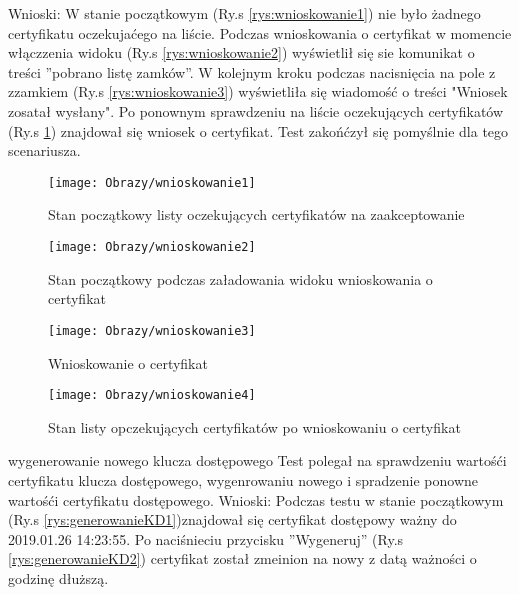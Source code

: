 \begin{enumerate*}
	Wnioski: W stanie początkowym (Ry.s \ref{rys:wnioskowanie1}) nie było żadnego certyfikatu oczekujaćego na liście. Podczas wnioskowania o certyfikat w momencie włączzenia widoku (Ry.s \ref{rys:wnioskowanie2}) wyświetlił się  sie komunikat o treści ''pobrano listę zamków''. W kolejnym kroku podczas nacisnięcia na pole z zzamkiem (Ry.s \ref{rys:wnioskowanie3}) wyświetliła się wiadomość o treści "Wniosek zosatał wysłany". Po ponownym sprawdzeniu na liście oczekujących certyfikatów (Ry.s \ref{rys:wnioskowanie4}) znajdował się wniosek o certyfikat. Test zakońćzył się pomyślnie dla tego scenariusza.
	
	
	\begin{figure}[ht!]

		\begin{minipage}{0.2\textwidth}
			\texttt{[image: Obrazy/wnioskowanie1]}
			\caption{Stan początkowy listy oczekujących certyfikatów na zaakceptowanie }
			\label{rys:wnioskowanie1}
		\end{minipage}
		\begin{minipage}{0.2\textwidth}
			\texttt{[image: Obrazy/wnioskowanie2]}
			\caption{Stan początkowy podczas załadowania widoku wnioskowania o certyfikat}
			\label{rys:wnioskowanie2}
		\end{minipage}
	
		\begin{minipage}{0.2\textwidth}
		\texttt{[image: Obrazy/wnioskowanie3]}
		\caption{Wnioskowanie o certyfikat}
		\label{rys:wnioskowanie3}
	\end{minipage}
	\begin{minipage}{0.2\textwidth}
		\texttt{[image: Obrazy/wnioskowanie4]}
		\caption{Stan listy opczekujących certyfikatów po wnioskowaniu o certyfikat}
		\label{rys:wnioskowanie4}
	\end{minipage}
	\end{figure}
	
	
	
	
	\item wygenerowanie nowego klucza dostępowego\newline
	Test polegał na sprawdzeniu wartośći certyfikatu klucza dostępowego, wygenrowaniu nowego i spradzenie ponowne wartośći certyfikatu dostępowego.
	Wnioski: Podczas testu w stanie początkowym (Ry.s \ref{rys:generowanieKD1})znajdował się certyfikat dostępowy ważny do 2019.01.26 14:23:55. Po naciśnieciu przycisku ''Wygeneruj''  (Ry.s \ref{rys:generowanieKD2}) certyfikat został zmeinion na nowy z datą ważności o godzinę dłuższą.
 

\end{enumerate*}
